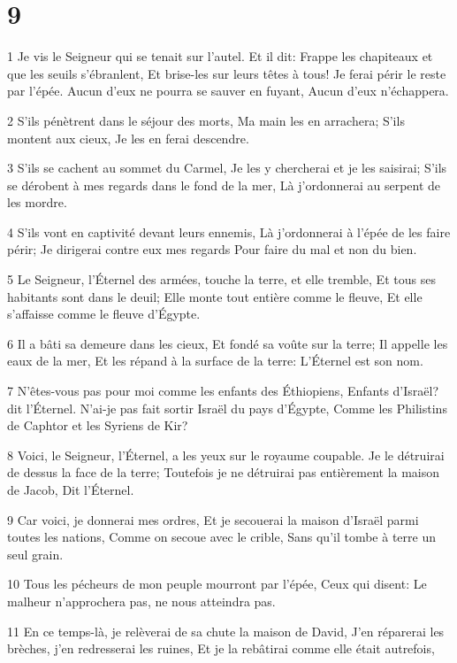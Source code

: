\chapter{9}

\par 1 Je vis le Seigneur qui se tenait sur l'autel. Et il dit: Frappe les chapiteaux et que les seuils s'ébranlent, Et brise-les sur leurs têtes à tous! Je ferai périr le reste par l'épée. Aucun d'eux ne pourra se sauver en fuyant, Aucun d'eux n'échappera.
\par 2 S'ils pénètrent dans le séjour des morts, Ma main les en arrachera; S'ils montent aux cieux, Je les en ferai descendre.
\par 3 S'ils se cachent au sommet du Carmel, Je les y chercherai et je les saisirai; S'ils se dérobent à mes regards dans le fond de la mer, Là j'ordonnerai au serpent de les mordre.
\par 4 S'ils vont en captivité devant leurs ennemis, Là j'ordonnerai à l'épée de les faire périr; Je dirigerai contre eux mes regards Pour faire du mal et non du bien.
\par 5 Le Seigneur, l'Éternel des armées, touche la terre, et elle tremble, Et tous ses habitants sont dans le deuil; Elle monte tout entière comme le fleuve, Et elle s'affaisse comme le fleuve d'Égypte.
\par 6 Il a bâti sa demeure dans les cieux, Et fondé sa voûte sur la terre; Il appelle les eaux de la mer, Et les répand à la surface de la terre: L'Éternel est son nom.
\par 7 N'êtes-vous pas pour moi comme les enfants des Éthiopiens, Enfants d'Israël? dit l'Éternel. N'ai-je pas fait sortir Israël du pays d'Égypte, Comme les Philistins de Caphtor et les Syriens de Kir?
\par 8 Voici, le Seigneur, l'Éternel, a les yeux sur le royaume coupable. Je le détruirai de dessus la face de la terre; Toutefois je ne détruirai pas entièrement la maison de Jacob, Dit l'Éternel.
\par 9 Car voici, je donnerai mes ordres, Et je secouerai la maison d'Israël parmi toutes les nations, Comme on secoue avec le crible, Sans qu'il tombe à terre un seul grain.
\par 10 Tous les pécheurs de mon peuple mourront par l'épée, Ceux qui disent: Le malheur n'approchera pas, ne nous atteindra pas.
\par 11 En ce temps-là, je relèverai de sa chute la maison de David, J'en réparerai les brèches, j'en redresserai les ruines, Et je la rebâtirai comme elle était autrefois,
